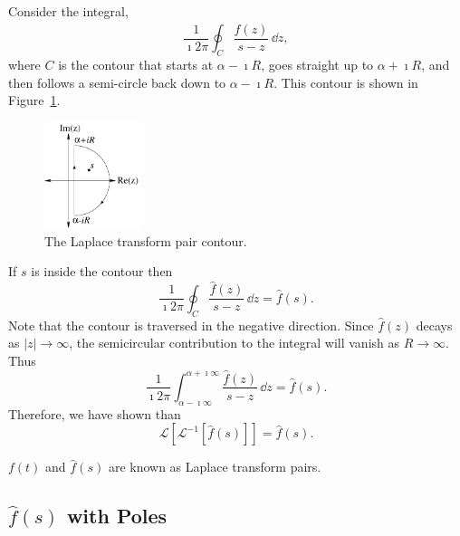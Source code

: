Consider the integral,
\[
\frac{1}{\imath 2 \pi} \oint_C \frac{\hat{f}(z)}{s-z}\,\dd z,
\]
where $C$ is the contour that starts at $\alpha - \imath R$, goes straight up
to $\alpha + \imath R$, and then follows a semi-circle back down to 
$\alpha - \imath R$.  This contour is shown in Figure~\ref{contour}.

\begin{figure}[h!]
  \begin{center}
    \includegraphics[width=0.25\textwidth]{ode/laplace/proof}
  \end{center}
  \caption{The Laplace transform pair contour.}
  \label{contour}
\end{figure}






If $s$ is inside the contour then
\[
\frac{1}{\imath 2 \pi} \oint_C \frac{\hat{f}(z)}{s-z}\,\dd z = \hat{f}(s).
\]
Note that the contour is traversed in the negative direction.  Since
$\hat{f}(z)$ decays as $|z| \to \infty$, the semicircular contribution to the
integral will vanish as $R \to \infty$.  Thus
\[
\frac{1}{\imath 2 \pi} \int_{\alpha - \imath \infty}^{\alpha + \imath \infty} \frac{\hat{f}(z)}{s-z}\,\dd z = \hat{f}(s).
\]
Therefore, we have shown than 
\[
\mathcal{L}[\mathcal{L}^{-1}[\hat{f}(s)]] = \hat{f}(s).
\]

$f(t)$ and $\hat{f}(s)$ are known as Laplace transform pairs.





\subsection{$\hat{f}(s)$ with Poles}


